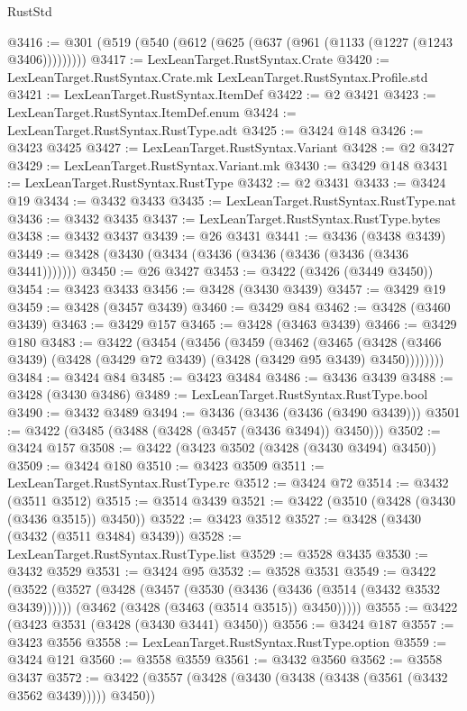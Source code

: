 \begin{lexlean}{RustStd}
\begin{coremodule}
@3416 := @301 (@519 (@540 (@612 (@625 (@637 (@961 (@1133 (@1227 (@1243 @3406)))))))))
@3417 := LexLeanTarget.RustSyntax.Crate
@3420 := LexLeanTarget.RustSyntax.Crate.mk LexLeanTarget.RustSyntax.Profile.std
@3421 := LexLeanTarget.RustSyntax.ItemDef
@3422 := @2 @3421
@3423 := LexLeanTarget.RustSyntax.ItemDef.enum
@3424 := LexLeanTarget.RustSyntax.RustType.adt
@3425 := @3424 @148
@3426 := @3423 @3425
@3427 := LexLeanTarget.RustSyntax.Variant
@3428 := @2 @3427
@3429 := LexLeanTarget.RustSyntax.Variant.mk
@3430 := @3429 @148
@3431 := LexLeanTarget.RustSyntax.RustType
@3432 := @2 @3431
@3433 := @3424 @19
@3434 := @3432 @3433
@3435 := LexLeanTarget.RustSyntax.RustType.nat
@3436 := @3432 @3435
@3437 := LexLeanTarget.RustSyntax.RustType.bytes
@3438 := @3432 @3437
@3439 := @26 @3431
@3441 := @3436 (@3438 @3439)
@3449 := @3428 (@3430 (@3434 (@3436 (@3436 (@3436 (@3436 (@3436 @3441)))))))
@3450 := @26 @3427
@3453 := @3422 (@3426 (@3449 @3450))
@3454 := @3423 @3433
@3456 := @3428 (@3430 @3439)
@3457 := @3429 @19
@3459 := @3428 (@3457 @3439)
@3460 := @3429 @84
@3462 := @3428 (@3460 @3439)
@3463 := @3429 @157
@3465 := @3428 (@3463 @3439)
@3466 := @3429 @180
@3483 := @3422
    (@3454
      (@3456
        (@3459
          (@3462
            (@3465
              (@3428 (@3466 @3439) (@3428 (@3429 @72 @3439) (@3428 (@3429 @95 @3439) @3450))))))))
@3484 := @3424 @84
@3485 := @3423 @3484
@3486 := @3436 @3439
@3488 := @3428 (@3430 @3486)
@3489 := LexLeanTarget.RustSyntax.RustType.bool
@3490 := @3432 @3489
@3494 := @3436 (@3436 (@3436 (@3490 @3439)))
@3501 := @3422 (@3485 (@3488 (@3428 (@3457 (@3436 @3494)) @3450)))
@3502 := @3424 @157
@3508 := @3422 (@3423 @3502 (@3428 (@3430 @3494) @3450))
@3509 := @3424 @180
@3510 := @3423 @3509
@3511 := LexLeanTarget.RustSyntax.RustType.rc
@3512 := @3424 @72
@3514 := @3432 (@3511 @3512)
@3515 := @3514 @3439
@3521 := @3422 (@3510 (@3428 (@3430 (@3436 @3515)) @3450))
@3522 := @3423 @3512
@3527 := @3428 (@3430 (@3432 (@3511 @3484) @3439))
@3528 := LexLeanTarget.RustSyntax.RustType.list
@3529 := @3528 @3435
@3530 := @3432 @3529
@3531 := @3424 @95
@3532 := @3528 @3531
@3549 := @3422
    (@3522
      (@3527
        (@3428
          (@3457 (@3530 (@3436 (@3436 (@3514 (@3432 @3532 @3439))))))
          (@3462 (@3428 (@3463 (@3514 @3515)) @3450)))))
@3555 := @3422 (@3423 @3531 (@3428 (@3430 @3441) @3450))
@3556 := @3424 @187
@3557 := @3423 @3556
@3558 := LexLeanTarget.RustSyntax.RustType.option
@3559 := @3424 @121
@3560 := @3558 @3559
@3561 := @3432 @3560
@3562 := @3558 @3437
@3572 := @3422 (@3557 (@3428 (@3430 (@3438 (@3438 (@3561 (@3432 @3562 @3439))))) @3450))

\end{coremodule}
\end{lexlean}
